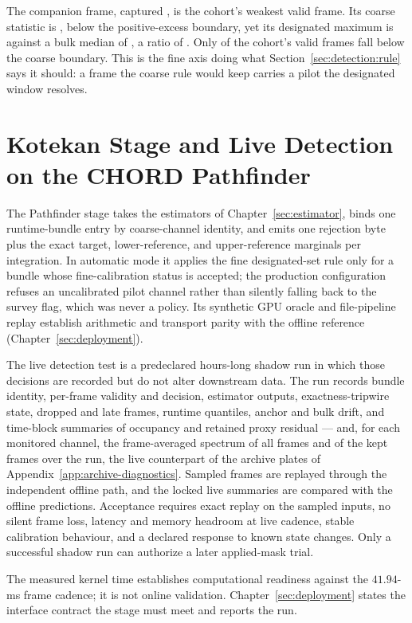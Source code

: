 The companion frame, captured , is the cohort's weakest valid frame. Its coarse statistic is , below the positive-excess boundary, yet its designated maximum is  against a bulk median of , a ratio of . Only  of the cohort's valid frames fall below the coarse boundary. This is the fine axis doing what Section~\ref{sec:detection:rule} says it should: a frame the coarse rule would keep carries a pilot the designated window resolves.

\section{Kotekan Stage and Live Detection on the CHORD Pathfinder}
\label{sec:detection:runtime}

The Pathfinder stage takes the estimators of Chapter~\ref{sec:estimator}, binds one runtime-bundle entry by coarse-channel identity, and emits one rejection byte plus the exact target, lower-reference, and upper-reference marginals per integration. In automatic mode it applies the fine designated-set rule only for a bundle whose fine-calibration status is accepted; the production configuration refuses an uncalibrated pilot channel rather than silently falling back to the survey flag, which was never a policy. Its synthetic GPU oracle and file-pipeline replay establish arithmetic and transport parity with the offline reference (Chapter~\ref{sec:deployment}).

The live detection test is a predeclared hours-long shadow run in which those decisions are recorded but do not alter downstream data. The run records bundle identity, per-frame validity and decision, estimator outputs, exactness-tripwire state, dropped and late frames, runtime quantiles, anchor and bulk drift, and time-block summaries of occupancy and retained proxy residual --- and, for each monitored channel, the frame-averaged spectrum of all frames and of the kept frames over the run, the live counterpart of the archive plates of Appendix~\ref{app:archive-diagnostics}. Sampled frames are replayed through the independent offline path, and the locked live summaries are compared with the offline predictions. Acceptance requires exact replay on the sampled inputs, no silent frame loss, latency and memory headroom at live cadence, stable calibration behaviour, and a declared response to known state changes. Only a successful shadow run can authorize a later applied-mask trial.

The measured  kernel time establishes computational readiness against the $41.94$-ms frame cadence; it is not online validation. Chapter~\ref{sec:deployment} states the interface contract the stage must meet and reports the run.

